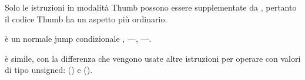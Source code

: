 
Solo le istruzioni  in modalità Thumb possono essere supplementate da , pertanto il codice Thumb 
ha un aspetto più ordinario.

 è un normale jump condizionale , 
---, 
---.

 è simile, con la differenza che vengono usate altre istruzioni per operare con valori
di tipo unsigned:  
() e  ().
